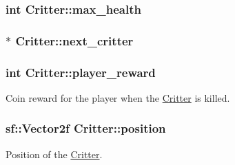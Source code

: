 \hypertarget{class_critter_a9b2e317fb3a104ea9b449f77c81d7d7a}{
\subsubsection[{max\+\_\+health}]{\setlength{\rightskip}{0pt plus 5cm}int Critter\+::max\+\_\+health\hspace{0.3cm}{\ttfamily [protected]}}}\label{class_critter_a9b2e317fb3a104ea9b449f77c81d7d7a}
\hypertarget{class_critter_a6017fbb8c863a2456f43b88996720927}{
\subsubsection[{next\+\_\+critter}]{$\ast$ Critter\+::next\+\_\+critter}}\label{class_critter_a6017fbb8c863a2456f43b88996720927}
\hypertarget{class_critter_a2a17f7366fbde83714742e66ba3e63a7}{
\subsubsection[{player\+\_\+reward}]{\setlength{\rightskip}{0pt plus 5cm}int Critter\+::player\+\_\+reward\hspace{0.3cm}{\ttfamily [protected]}}}\label{class_critter_a2a17f7366fbde83714742e66ba3e63a7}


Coin reward for the player when the \hyperlink{class_critter}{Critter} is killed. 

\hypertarget{class_critter_a7973c2224ad88f4ef758440c306ee31c}{
\subsubsection[{position}]{\setlength{\rightskip}{0pt plus 5cm}sf\+::\+Vector2f Critter\+::position\hspace{0.3cm}{\ttfamily [protected]}}}\label{class_critter_a7973c2224ad88f4ef758440c306ee31c}


Position of the \hyperlink{class_critter}{Critter}. 

